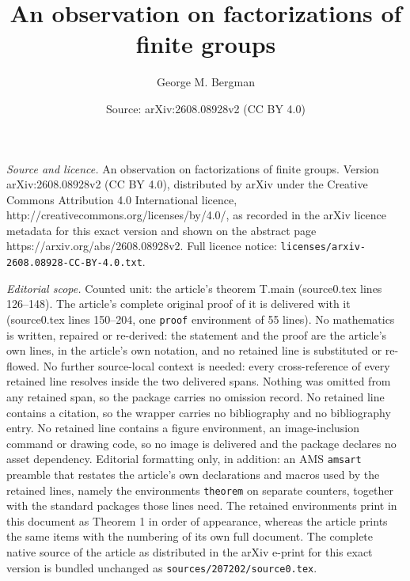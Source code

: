 \documentclass[10pt,a4paper]{amsart}
\title{An observation on factorizations of finite groups}
\author{George M. Bergman}
\date{Source: arXiv:2608.08928v2 (CC BY 4.0)}
\begin{document}
\maketitle

\noindent\emph{Source and licence.} An observation on factorizations of finite groups. Version arXiv:2608.08928v2 (CC BY 4.0), distributed by arXiv under the Creative Commons Attribution 4.0 International licence, http://creativecommons.org/licenses/by/4.0/, as recorded in the arXiv licence metadata for this exact version and shown on the abstract page https://arxiv.org/abs/2608.08928v2. Full licence notice: \texttt{licenses/arxiv-2608.08928-CC-BY-4.0.txt}.\par\smallskip

\noindent\textit{Editorial scope.} Counted unit: the article's theorem T.main (source0.tex lines 126--148). The article's complete original proof of it is delivered with it (source0.tex lines 150--204, one \texttt{proof} environment of 55 lines). No mathematics is written, repaired or re-derived: the statement and the proof are the article's own lines, in the article's own notation, and no retained line is substituted or re-flowed.  No further source-local context is needed: every cross-reference of every retained line resolves inside the two delivered spans.  Nothing was omitted from any retained span, so the package carries no omission record.  No retained line contains a citation, so the wrapper carries no bibliography and no bibliography entry.  No retained line contains a figure environment, an image-inclusion command or drawing code, so no image is delivered and the package declares no asset dependency.  Editorial formatting only, in addition: an AMS \texttt{amsart} preamble that restates the article's own declarations and macros used by the retained lines, namely the environments \texttt{theorem} on separate counters, together with the standard packages those lines need.  The retained environments print in this document as Theorem 1 in order of appearance, whereas the article prints the same items with the numbering of its own full document.  The complete native source of the article as distributed in the arXiv e-print for this exact version is bundled unchanged as \texttt{sources/207202/source0.tex}.
\end{document}
